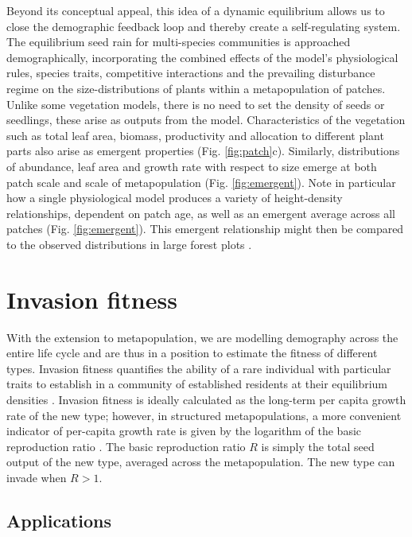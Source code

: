 \documentclass[a4paper,11pt]{article}
\begin{document}
Beyond its conceptual appeal, this idea of a dynamic equilibrium allows
us to close the demographic feedback loop and thereby create a
self-regulating system. The equilibrium seed rain for multi-species
communities is approached demographically, incorporating the combined
effects of the model's physiological rules, species traits, competitive
interactions and the prevailing disturbance regime on the
size-distributions of plants within a metapopulation of patches. Unlike
some vegetation models, there is no need to set the density of seeds or
seedlings, these arise as outputs from the model. Characteristics of the
vegetation such as total leaf area, biomass, productivity and allocation
to different plant parts also arise as emergent properties (Fig.
\ref{fig:patch}c). Similarly, distributions of abundance, leaf area and
growth rate with respect to size emerge at both patch scale and scale of
metapopulation (Fig. \ref{fig:emergent}). Note in particular how a single
physiological model produces a variety of height-density relationships, 
dependent on patch age, as well as an emergent average across all patches 
(Fig. \ref{fig:emergent}). This emergent relationship might then be 
compared to the observed distributions in large forest plots \citep{Muller-2006}.

\section{Invasion fitness}

With the extension to metapopulation, we are modelling demography across
the entire life cycle and are thus in a position to estimate the fitness
of different types. Invasion fitness quantifies the ability of a rare
individual with particular traits to establish in a community of
established residents at their equilibrium densities \citep{Metz-1992}.
Invasion fitness
is ideally calculated as the long-term per capita growth rate of the new
type; however, in structured metapopulations, a more convenient
indicator of per-capita growth rate is given by the logarithm of the
basic reproduction ratio \citep{Gyllenberg-2001, Metz-2001}. The basic
reproduction ratio \(R\) is simply the total seed output of the new
type, averaged across the metapopulation. The new type can invade when
\(R > 1\).

\subsection{Applications}
\end{document}

